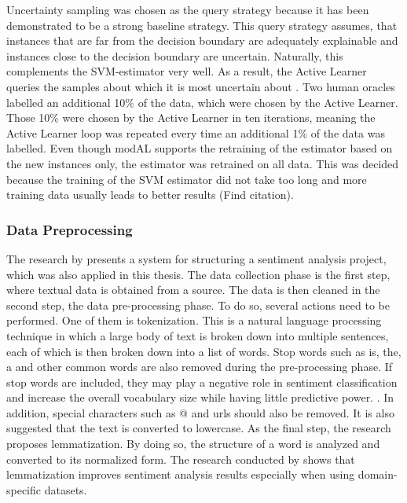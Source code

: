 \documentclass[11pt, a4paper]{article}
\begin{document}
Uncertainty sampling was chosen as the query strategy because it has been demonstrated to be a strong baseline strategy. 
This query strategy assumes, that instances that are far from the decision boundary are adequately explainable and instances close to the 
decision boundary are uncertain. Naturally, this complements the SVM-estimator very well. As a result, the Active Learner queries 
the samples about which it is most uncertain about \citep{osbonre2004ensemblebased}. Two human oracles labelled an additional 10\% of the data,
which were chosen by the Active Learner. Those 10\% were chosen by the Active Learner in ten iterations, meaning the Active Learner loop was repeated
every time an additional 1\% of the data was labelled. Even though modAL supports the retraining of the estimator based on the new instances only,
the estimator was retrained on all data. This was decided because the training of the SVM estimator did not take too long and more training data
usually leads to better results (Find citation).

\subsubsection{Data Preprocessing}
The research by \cite{jemai2021SentimentAnalysis} presents a system for structuring a sentiment analysis project, which was also applied in this thesis.
The data collection phase is the first step, where textual data is obtained from a source. 
The data is then cleaned in the second step, the data pre-processing phase. To do so, several actions need to be performed.
One of them is tokenization. This is a natural language processing technique in which a large body of text is broken down into multiple sentences, 
each of which is then broken down into a list of words. Stop words such as is, the, a and other common words are also removed during the 
pre-processing phase. If stop words are included, they may play a negative role in sentiment classification and increase the overall 
vocabulary size while having little predictive power. \citep{zhao2017comparisontextprocess}.
In addition, special characters such as @ and urls should also be removed. 
It is also suggested that the text is converted to lowercase. As the final step, the research proposes lemmatization. By doing so,
the structure of a word is analyzed and converted to its normalized form. The research conducted by \cite{camachocollados2018role} 
shows that lemmatization improves sentiment analysis results especially when using domain-specific datasets.
\end{document}
